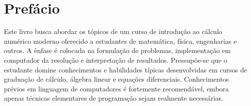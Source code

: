 
\chapter*{Prefácio}

Este livro busca abordar os tópicos de um curso de introdução ao cálculo numérico moderno oferecido a estudantes de matemática, física, engenharias e outros. A ênfase é colocada na formulação de problemas, implementação em computador da resolução e interpretação de resultados. Pressupõe-se que o estudante domine conhecimentos e habilidades típicas desenvolvidas em cursos de graduação de cálculo, álgebra linear e equações diferenciais. Conhecimentos prévios em linguagem de computadores é fortemente recomendável, embora apenas técnicas elementares de programação sejam realmente necessárias.

